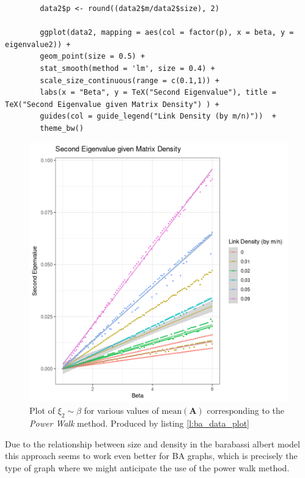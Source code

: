 \documentclass[11pt, twoside]{report}
\begin{document}
\begin{listing}[htbp]
    \begin{tcolorbox}
        \begin{verbatim}
        data2$p <- round((data2$m/data2$size), 2)

        ggplot(data2, mapping = aes(col = factor(p), x = beta, y = eigenvalue2)) +
        geom_point(size = 0.5) +
        stat_smooth(method = 'lm', size = 0.4) +
        scale_size_continuous(range = c(0.1,1)) +
        labs(x = "Beta", y = TeX("Second Eigenvalue"), title = TeX("Second Eigenvalue given Matrix Density") ) +
        guides(col = guide_legend("Link Density (by m/n)"))  +
        theme_bw()
        \end{verbatim}
    \end{tcolorbox}
\caption{\label{l:ba_data_plot} Plot \(\xi_{2} \sim \beta\) for discrete values of \(p\), shown in figure \ref{fig:ba_data_plot} }
\end{listing}


\begin{figure}[htbp]
\centering
\includegraphics[width=12cm]{media/constant_dens_ba_density_sqrt.png}
\caption{\label{fig:ba_data_plot} Plot of \(\xi_{2}\sim \beta\) for various values of \(\mathrm{mean}\left(\mathbf{A}\right)\) corresponding to the \textit{Power Walk} method. Produced by listing \ref{l:ba_data_plot} }
\end{figure}

Due to the relationship between size and density in the barabassi albert model this approach seems to work even better for BA graphs, which is precisely the type of graph where we might anticipate the use of the power walk method.
\end{document}
